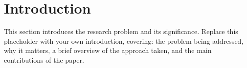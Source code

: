 
\section{Introduction}


This section introduces the research problem and its significance.
Replace this placeholder with your own introduction, covering:
the problem being addressed, why it matters, a brief overview of
the approach taken, and the main contributions of the paper.
